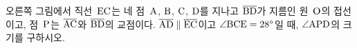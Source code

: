 \noindent\begin{minipage}[t]{0.58\linewidth}\vspace{0pt}\raggedright 오른쪽 그림에서 직선~$\mathrm{EC}$는 네 점~$\mathrm{A}$, $\mathrm{B}$, $\mathrm{C}$, $\mathrm{D}$를 지나고 $\overline{\mathrm{BD}}$가 지름인 원~$\mathrm{O}$의 접선이고, 점~$\mathrm{P}$는 $\overline{\mathrm{AC}}$와 $\overline{\mathrm{BD}}$의 교점이다. $\overline{\mathrm{AD}}\parallel\overline{\mathrm{EC}}$이고 $\angle\mathrm{BCE}=28^\circ$일 때, $\angle\mathrm{APD}$의 크기를 구하시오.\end{minipage}\hfill\begin{minipage}[t]{0.4\linewidth}\vspace{0pt}\centering \resizebox{\ifdim\width>\linewidth\linewidth\else\width\fi}{!}{}\end{minipage}\par
